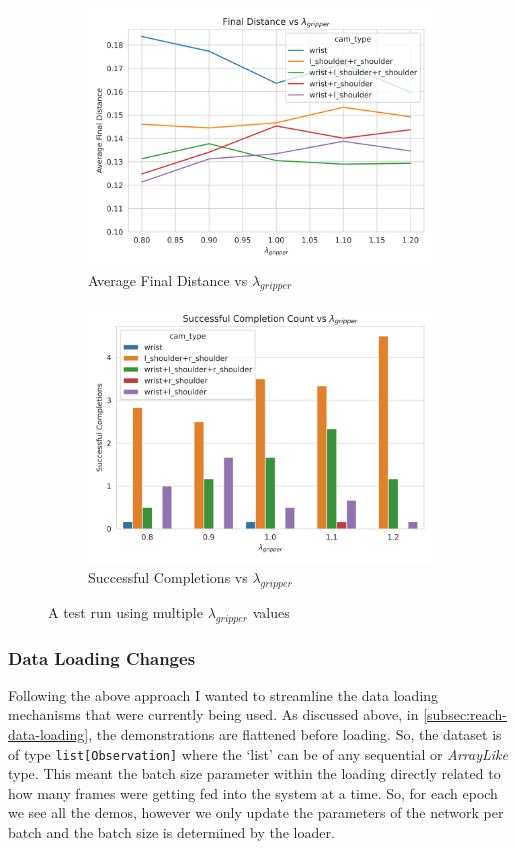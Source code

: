 \begin{figure}[htpb] %
  \centering
  \begin{subfigure}{0.45\linewidth}
    \centering
    \includegraphics[width=0.7\linewidth]{assets/cam-comb/grasp-simple/tuning-normal-old-policy-lambda-g.png}
    \caption{Average Final Distance vs $\lambda_{gripper}$}\label{subfig:grasp-tuning-lambda-g}
  \end{subfigure}
  \begin{subfigure}{0.45\linewidth}
    \centering
    \includegraphics[width=0.7\linewidth]{assets/cam-comb/grasp-simple/tuning-normal-old-policy-success-lambda-g.png}
    \caption{Successful Completions vs $\lambda_{gripper}$}\label{subfig:grasp-tuning-lambda-g-success}
  \end{subfigure}
  \caption{A test run using multiple $\lambda_{gripper}$ values}\label{fig:grasp-tuning-lambda-g}
\end{figure}


\subsubsection{Data Loading Changes}\label{subsec:grasp-data-loading-changes}
Following the above approach I wanted to streamline the data loading mechanisms that were currently being used. As discussed above, in \ref{subsec:reach-data-loading}, the demonstrations are flattened before loading. So, the dataset is of type \verb|list[Observation]| where the `list' can be of any sequential or \emph{ArrayLike} type. This meant the batch size parameter within the loading directly related to how many frames were getting fed into the system at a time. So, for each epoch we see all the demos, however we only update the parameters of the network per batch and the batch size is determined by the loader.

